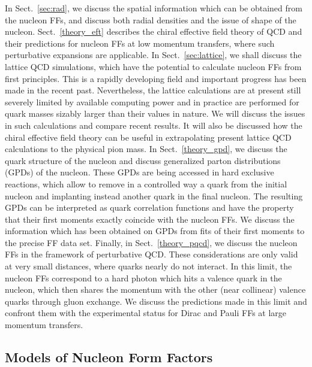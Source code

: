 \newline
\indent 
In Sect.~\ref{sec:rad}, we discuss the spatial 
information which can be obtained from the nucleon FFs, and discuss 
both radial densities and the issue of shape of the nucleon. 
\newline
\indent
Sect.~\ref{theory_eft} describes the chiral 
effective field theory of QCD and their predictions for nucleon FFs at low 
momentum transfers, where such perturbative expansions are applicable. 
\newline
\indent
In Sect.~\ref{sec:lattice}, we shall discuss the lattice QCD simulations, 
which have the potential to calculate nucleon FFs from first principles. 
This is a rapidly developing field and important progress has been made in the 
recent past. Nevertheless, the lattice calculations 
are at present still severely limited by available computing 
power and in practice are performed for quark masses sizably larger than their 
values in nature. We will discuss the issues in such calculations and compare 
recent results. It will also be discussed how the chiral effective field
theory can be useful in extrapolating present lattice QCD calculations to the 
physical pion mass.  
\newline
\indent
In Sect.~\ref{theory_gpd}, we discuss the quark structure of the nucleon and 
discuss generalized parton distributions (GPDs) of the nucleon. 
These GPDs are being accessed in hard exclusive reactions, which allow to 
remove in a controlled way a quark 
from the initial nucleon and implanting instead another quark in the final 
nucleon. The resulting GPDs can be interpreted as quark correlation functions 
and have the property that their first moments exactly coincide with the
nucleon FFs. We discuss the information which has been obtained on GPDs 
from fits of their first moments to the precise FF data set.   
\newline
\indent
Finally, in Sect.~\ref{theory_pqcd}, we discuss the nucleon FFs in the 
framework of perturbative QCD. These considerations are only valid 
at very small distances, where quarks nearly do not interact. In this limit, 
the nucleon FFs correspond to a hard photon which hits a valence quark 
in the nucleon, which then shares the momentum with the other (near collinear)
valence quarks through gluon exchange. 
We discuss the predictions made in this limit and confront them with the
experimental status for Dirac and Pauli FFs at large momentum transfers.


\subsection{Models of Nucleon Form Factors}
\label{subsec:models}

